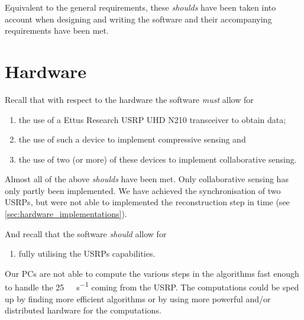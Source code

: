 \documentclass[a4paper, openany, oneside]{memoir}
\begin{document}
Equivalent to the general requirements, these \textit{shoulds} have been taken into account when designing and writing the software and their accompanying requirements have been met.

\section{Hardware}

Recall that with respect to the hardware the software \emph{must} allow for
\begin{enumerate}
    \item the use of a Ettus Research USRP UHD N210 transceiver to obtain data;
    \item the use of such a device to implement compressive sensing and
    \item the use of two (or more) of these devices to implement collaborative sensing.
\end{enumerate}

Almost all of the above \textit{shoulds} have been met. Only collaborative sensing has only partly been implemented. We have achieved the synchronisation of two USRPs, but were not able to implemented the reconstruction step in time (see \cref{sec:hardware_implementations}).

And recall that the software \emph{should} allow for
\begin{enumerate}
    \item fully utilising the USRPs capabilities.
\end{enumerate}

Our PCs are not able to compute the various steps in the algorithms fast enough to handle the \SI{25}{\mega\sample\per\second} coming from the USRP. The computations could be sped up by finding more efficient algorithms or by using more powerful and/or distributed hardware for the computations.
\end{document}

